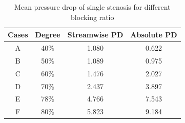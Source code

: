 \begin{table}[h]
	\caption{Mean pressure drop of single stenosis for different blocking ratio}
	\vspace{-5pt}
	\begin{center}
		\begin{tabular}{|c|c|c|c|}
			\hline
			\textbf{Cases} &\textbf{Degree} & \textbf{Streamwise PD} & \textbf{Absolute PD}\\
			\hline
			A & 40\% & 1.080 & 0.622\\
			\hline
			B & 50\% & 1.089 & 0.975\\
			\hline
			C & 60\% & 1.476 & 2.027\\
			\hline
			D & 70\% & 2.437 & 3.897\\
			\hline
			E & 78\% & 4.766 & 7.543\\
			\hline
			F & 80\% & 5.823 & 9.184\\
			\hline
		\end{tabular}
	\end{center} 
\end{table}
